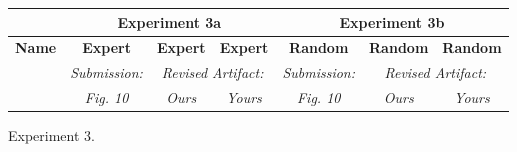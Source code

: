 \begin{figure}

\experimentTableSize

\begin{tabular}{l|cccccc}
& \multicolumn{3}{c}{\textbf{Experiment 3a}}
& \multicolumn{3}{c}{\textbf{Experiment 3b}} \\\hline
\textbf{Name} &
\textbf{Expert} & \textbf{Expert} & \textbf{Expert} &
\textbf{Random} & \textbf{Random} & \textbf{Random} \\
&
\textit{Submission:} & \multicolumn{2}{c}{\textit{Revised Artifact:}} &
\textit{Submission:} & \multicolumn{2}{c}{\textit{Revised Artifact:}} \\
&
\textit{Fig. 10} & \textit{Ours} & \textit{Yours} &
\textit{Fig. 10} & \textit{Ours} & \textit{Yours} \\

\end{tabular}

\caption{Experiment 3.}

\end{figure}
